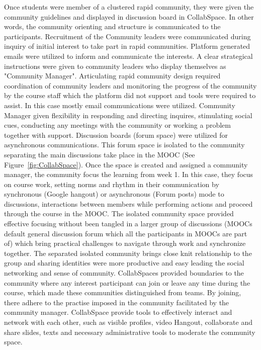 \documentclass[manuscript,screen,review]{acmart}
\begin{document}
Once students were member of a clustered rapid community, they were given the community guidelines and displayed in discussion board in CollabSpace. In other words, the community orienting and structure is communicated to the participants. Recruitment of the Community leaders were communicated during inquiry of initial interest to take part in rapid communities. Platform generated emails were utilized to inform and communicate the interests. A clear strategical instructions were given to community leaders who display themselves as "Community Manager". Articulating rapid community design required coordination of community leaders and monitoring the progress of the community by the course staff which the platform did not support and tools were required to assist. In this case mostly email communications were utilized. Community Manager given flexibility in responding and directing inquires, stimulating social cues, conducting any meetings with the community or working a problem together with support. Discussion boards (forum space) were utilized for asynchronous communications. This forum space is isolated to the community separating the main discussions take place in the MOOC (See Figure~\ref{fig:CollabSpace}). Once the space is created and assigned a community manager, the community focus the learning from week 1. In this case, they focus on course work, setting norms and rhythm in their communication by synchronous (Google hangout) or asynchronous (Forum posts) mode to discussions, interactions between members while performing actions and proceed through the course in the MOOC. The isolated community space provided effective focusing without been tangled in a larger group of discussions (MOOCs default general discussion forum which all the participants in MOOCs are part of) which bring practical challenges to navigate through work and synchronize together. The separated isolated community brings close knit relationship to the group and sharing identities were more productive and easy leading the social networking and sense of community. CollabSpaces provided boundaries to the community where any interest participant can join or leave any time during the course, which made these communities distinguished from teams. By joining, there adhere to the practise imposed in the community facilitated by the community manager. CollabSpace provide tools to effectively interact and network with each other, such as visible profiles, video Hangout, collaborate and share slides, texts and necessary administrative tools to moderate the community space. 
\end{document}
